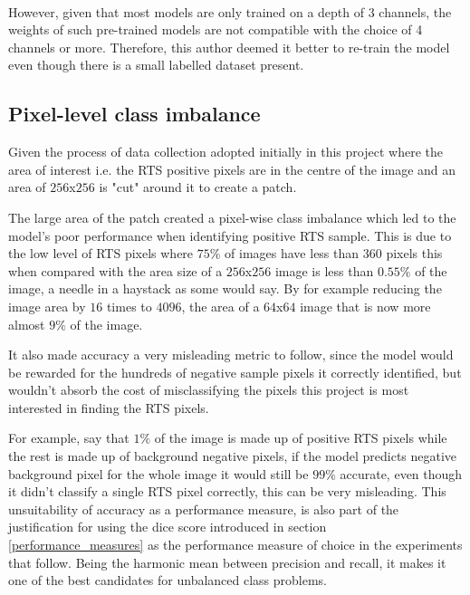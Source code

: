 \paragraph{}
However, given that most models are only trained on a depth of 3 channels, the weights of such pre-trained models are not compatible with the choice of 4 channels or more.
Therefore, this author deemed it better to re-train the model even though there is a small labelled dataset present.
\subsection{Pixel-level class imbalance} \label{class_imbalance}

Given the process of data collection adopted initially in this project where the area of interest i.e. the \gls{RTS} positive pixels are in the centre of the image and an area of $256$x$256$ is "cut" around it to create a patch. 

The large area of the patch created a pixel-wise class imbalance which led to the model's poor performance when identifying positive \gls{RTS} sample. This is due to the low level of \gls{RTS} pixels where $75\%$ of images have less than $360$ pixels this when compared with the area size of a $256$x$256$ image is less than $0.55\%$ of the image, a needle in a haystack as some would say. By for example reducing the image area by $16$ times to $4096$, the area of a $64$x$64$ image that is now more almost $9\%$ of the image.

It also made accuracy a very misleading metric to follow, since the model would be rewarded for the hundreds of negative sample pixels it correctly identified, but wouldn't absorb the cost of misclassifying the pixels this project is most interested in finding the \gls{RTS} pixels. 

For example, say that $1\%$ of the image is made up of positive \gls{RTS} pixels while the rest is made up of background negative pixels, if the model predicts negative background pixel for the whole image it would still be $99\%$ accurate, even though it didn't classify a single \gls{RTS} pixel correctly, this can be very misleading.
This unsuitability of accuracy as a performance measure, is also part of the justification for using the dice score introduced in section \ref{performance_measures} as the performance measure of choice in the experiments that follow. Being the harmonic mean between precision and recall, it makes it one of the best candidates for unbalanced class problems.

